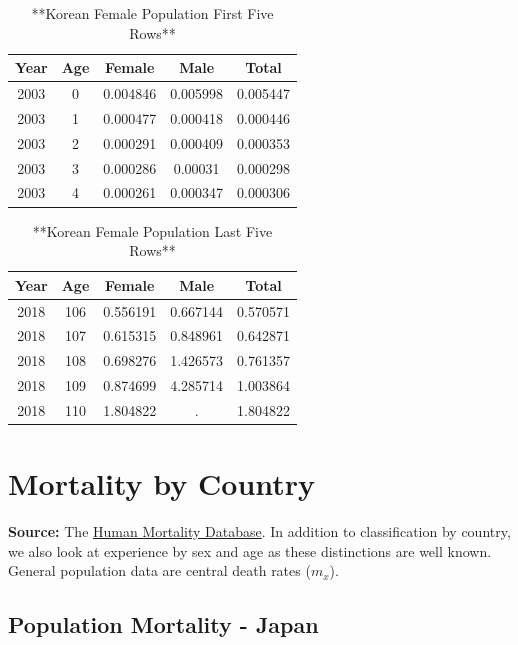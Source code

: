 \documentclass[
]{book}
\begin{document}
\begin{table}

\caption{\label{tab:unnamed-chunk-29}**Korean Female Population First Five Rows**}
\centering
\begin{tabular}[t]{c|c|c|c|c}
\hline
Year & Age & Female & Male & Total\\
\hline
2003 & 0 & 0.004846 & 0.005998 & 0.005447\\
\hline
2003 & 1 & 0.000477 & 0.000418 & 0.000446\\
\hline
2003 & 2 & 0.000291 & 0.000409 & 0.000353\\
\hline
2003 & 3 & 0.000286 & 0.00031 & 0.000298\\
\hline
2003 & 4 & 0.000261 & 0.000347 & 0.000306\\
\hline
\end{tabular}
\end{table}

\begin{table}

\caption{\label{tab:unnamed-chunk-29}**Korean Female Population Last Five Rows**}
\centering
\begin{tabular}[t]{c|c|c|c|c}
\hline
Year & Age & Female & Male & Total\\
\hline
2018 & 106 & 0.556191 & 0.667144 & 0.570571\\
\hline
2018 & 107 & 0.615315 & 0.848961 & 0.642871\\
\hline
2018 & 108 & 0.698276 & 1.426573 & 0.761357\\
\hline
2018 & 109 & 0.874699 & 4.285714 & 1.003864\\
\hline
2018 & 110 & 1.804822 & . & 1.804822\\
\hline
\end{tabular}
\end{table}

\hypertarget{Sec:MortalityCountry}{%
\section{Mortality by Country}\label{Sec:MortalityCountry}}

\textbf{Source:} The \href{http://www.mortality.org/}{Human Mortality Database}. In addition to classification by country, we also look at experience by sex and age as these distinctions are well known. General population data are central death rates (\(m_x\)).

\hypertarget{population-mortality---japan}{%
\subsection*{Population Mortality - Japan}\label{population-mortality---japan}}
\end{document}
